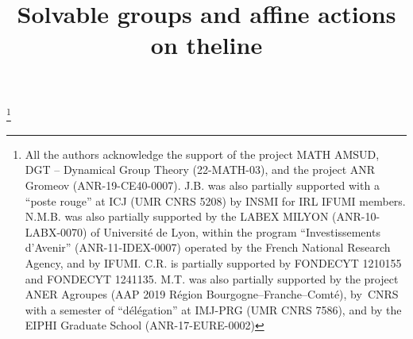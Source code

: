 \documentclass[JEP,XML,SOM,Unicode,NoFloatCountersInSection,published]{cedram}
\theoremstyle{definition}
\begin{document}
\frontmatter

\title{Solvable groups and affine actions on the\nobreakspace line}

\author[\initial{J.} \lastname{Brum}]{ }
\address{IMERL, Facultad de Ingeniería, Universidad de la República,\\
Julio Herrera y Reissig 565, Montevideo, Uruguay}
\urladdr{}

\author[\initial{N.} \lastname{Matte Bon}]{ }
\address{Université Claude Bernard Lyon 1, CNRS, Institut Camille Jordan (ICJ, UMR CNRS 5208),\\
43 blvd.\ du 11 novembre 1918, 69622 Villeurbanne, France}

\author[\initial{C.} \lastname{Rivas}]{ }
\address{Departamento de Matemáticas, Universidad de Chile,\\
Las Palmeras 3425, Ñuñoa, Santiago, Chile}

\author[\initial{M.} \lastname{Triestino}]{ }
\address{Institut de Mathématiques de Bourgogne (IMB, UMR CNRS 5584), Université de Bourgogne,\\
9 av.~Alain Savary, 21000 Dijon, France\\
\& Institut Universitaire de France}

\thanks{All the authors acknowledge the support of the project MATH AMSUD, DGT -- Dynamical Group Theory (22-MATH-03), and the project ANR Gromeov (ANR-19-CE40-0007). J.B. was also partially supported with a ``poste rouge'' at ICJ (UMR CNRS 5208) by INSMI for IRL IFUMI members. N.M.B. was also partially supported by the LABEX MILYON (ANR-10-LABX-0070) of Université de Lyon, within the program ``Investissements d'Avenir'' (ANR-11-IDEX-0007) operated by the French National Research Agency, and by IFUMI. C.R. is partially supported by FONDECYT 1210155 and FONDECYT 1241135. M.T. was also partially supported by the project ANER Agroupes (AAP 2019 Région Bourgogne--Franche--Comté), by~CNRS with a semester of ``délégation'' at IMJ-PRG (UMR CNRS 7586), and by the EIPHI Graduate School (ANR-17-EURE-0002)}
\end{document}
